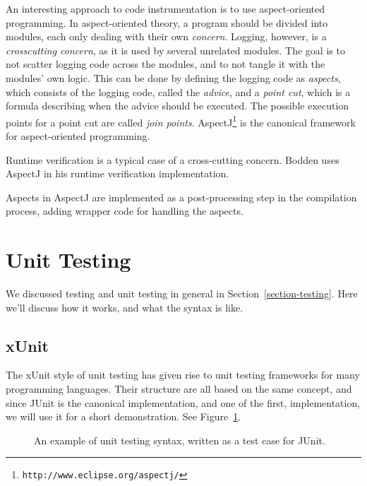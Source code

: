 \documentclass[a4paper,11pt]{kth-mag}
\begin{document}
An interesting approach to code instrumentation is to use aspect-oriented
programming. In aspect-oriented theory, a program should be divided into
modules, each only dealing with their own \textit{concern}. Logging, however,
is a \textit{crosscutting concern}, as it is used by several unrelated modules.
The goal is to not scatter logging code across the modules, and to not tangle
it with the modules' own logic. This can be done by defining the logging code
as \textit{aspects}, which consists of the logging code, called the
\textit{advice}, and a \textit{point cut}, which is a formula describing when
the advice should be executed. The possible execution points for a point cut
are called \textit{join points}.
AspectJ\footnote{\texttt{http://www.eclipse.org/aspectj/}} is the canonical
framework for aspect-oriented programming.

Runtime verification is a typical case of a cross-cutting concern. Bodden
\cite{bodden05efficientrv} uses AspectJ in his runtime verification
implementation.

Aspects in AspectJ are implemented as a post-processing step in the compilation
process, adding wrapper code for handling the aspects.


\section{Unit Testing} \label{section-unit-testing}

We discussed testing and unit testing in general in
Section~\ref{section-testing}. Here we'll discuss how it works, and what the
syntax is like.


\subsection{xUnit}

The xUnit style of unit testing \cite{fowlerxunit} has given rise to unit
testing frameworks for many programming languages. Their structure are all
based on the same concept, and since JUnit is the canonical implementation, and
one of the first, implementation, we will use it for a short demonstration. See
Figure~\ref{figure-junit}.

\begin{figure}[h!]
	\begin{center}
	\begin{minipage}{0.7\textwidth}
		\lstset{language=Java}
		
	\end{minipage}
	\end{center}
	\caption{An example of unit testing syntax, written as a test case for JUnit.}
	\label{figure-junit}
\end{figure}
\end{document}

